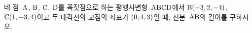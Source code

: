 네 점~$\mathrm{A}$, $\mathrm{B}$, $\mathrm{C}$, $\mathrm{D}$를 꼭짓점으로 하는 평행사변형~$\mathrm{ABCD}$에서 $\mathrm{B}(-3{,}\mkern3mu\mathopen{}2{,}\mkern3mu\mathopen{}-4)$, $\mathrm{C}(1{,}\mkern3mu\mathopen{}-3{,}\mkern3mu\mathopen{}4)$이고 두 대각선의 교점의 좌표가 $(0{,}\mkern3mu\mathopen{}4{,}\mkern3mu\mathopen{}3)$일 때, 선분~$\mathrm{AB}$의 길이를 구하시오.

